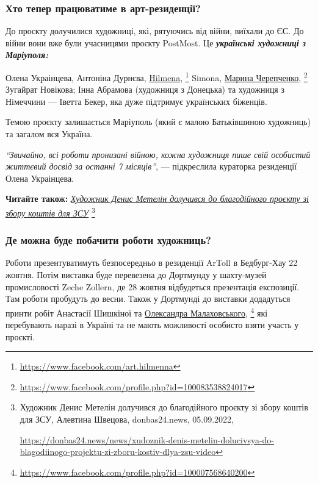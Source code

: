 
\subsubsection{Хто тепер працюватиме в арт-резиденції?}

До проєкту долучилися художниці, які, рятуючись від війни, виїхали до ЄС. До
війни вони вже були учасницями проєкту PostMost. Це \textbf{\emph{українські художниці з
Маріуполя:}}

Олена Украінцева, Антоніна Дурнєва, \href{https://www.facebook.com/art.hilmenna}{Hilmena},%
\footnote{\url{https://www.facebook.com/art.hilmenna}} Simona, \href{https://www.facebook.com/profile.php?id=100083538824017}{Марина Черепченко},%
\footnote{\url{https://www.facebook.com/profile.php?id=100083538824017}}
Зугайрат Новікова; Інна Абрамова (художниця з Донецька) та художниця з
Німеччини — Іветта Бекер, яка дуже підтримує українських біженців.

Темою проєкту залишається Маріуполь (який є малою Батьківшиною художниць) та
загалом вся Україна.

\begin{leftbar}
\emph{\enquote{Звичайно, всі роботи пронизані війною, кожна художниця пише свій особистий
життєвий досвід за останні 7 місяців}}, — підкреслила кураторка
резиденції Олена Украінцева.
\end{leftbar}

\textbf{Читайте також:} \href{https://donbas24.news/news/xudoznik-denis-metelin-dolucivsya-do-blagodiinogo-projektu-zi-zboru-kostiv-dlya-zsu-video}{\emph{Художник Денис Метелін долучився до благодійного проєкту зі збору коштів для ЗСУ}}%
\footnote{Художник Денис Метелін долучився до благодійного проєкту зі збору коштів для ЗСУ, Алевтина Швецова, donbas24.news, 05.09.2022, \par%
\url{https://donbas24.news/news/xudoznik-denis-metelin-dolucivsya-do-blagodiinogo-projektu-zi-zboru-kostiv-dlya-zsu-video}%
}


\subsubsection{Де можна буде побачити роботи художниць?}

Роботи презентуватимуть безпосередньо в резиденції ArToll в Бедбург-Хау 22
жовтня. Потім виставка буде перевезена до Дортмунду у шахту-музей промисловості
Zeche Zollern, де 28 жовтня відбудеться презентація експозиції. Там роботи
пробудуть до весни. Також у Дортмунді до виставки додадуться принти робіт
Анастасії Шишкіної та \href{https://www.facebook.com/profile.php?id=100007568640200}{Олександра Малаховського},%
\footnote{\url{https://www.facebook.com/profile.php?id=100007568640200}} які перебувають наразі в
Україні та не мають можливості особисто взяти участь у проєкті.

